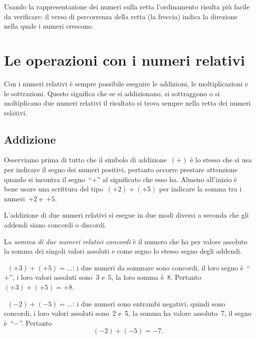 Usando la rappresentazione dei numeri sulla retta l'ordinamento risulta più facile da verificare:
il verso di percorrenza della retta (la freccia) indica la direzione nella quale i numeri crescono.

\vspazio\ovalbox{\risolvii \ref{ese:2.1}, \ref{ese:2.2}, \ref{ese:2.3}, \ref{ese:2.4}}

\section{Le operazioni con i numeri relativi}

Con i numeri relativi è sempre possibile eseguire le addizioni, le moltiplicazioni e le sottrazioni.
Questo significa che se si addizionano, si sottraggono o si moltiplicano due numeri relativi il risultato si
trova sempre nella retta dei numeri relativi.

\subsection{Addizione}

Osserviamo prima di tutto che il simbolo di addizione~$(+)$ è lo stesso che si usa per indicare il segno dei numeri
positivi, pertanto occorre prestare attenzione quando si incontra il segno~``$+$'' al significato che esso ha.
Almeno all'inizio è bene usare una scrittura del tipo~$(+2)+(+5)$ per indicare la somma tra i numeri~$+2$ e~$+5$.

L'addizione di due numeri relativi si esegue in due modi diversi a seconda che gli addendi siano concordi o discordi.

La \emph{somma di due numeri relativi concordi} è il numero che ha per valore assoluto la somma dei singoli valori assoluti e
come segno lo stesso segno degli addendi.

\pagebreak
\begin{exrig}
 \begin{esempio}
~$(+3)+(+5)=\ldots$: i due numeri da sommare sono concordi, il loro segno è~``$+$'', i loro valori assoluti sono~3 e~5,
la loro somma è~8. Pertanto~$(+3)+(+5)=+8$.
 \end{esempio}

 \begin{esempio}
~$(-2)+(-5)=\ldots$: i due numeri sono entrambi negativi, quindi sono concordi, i loro valori assoluti sono~2 e~5,
la somma ha valore assoluto~7, il segno è~``$-$''. Pertanto
\[(-2)+(-5)=-7.\]
 \end{esempio}

\end{exrig}
	
